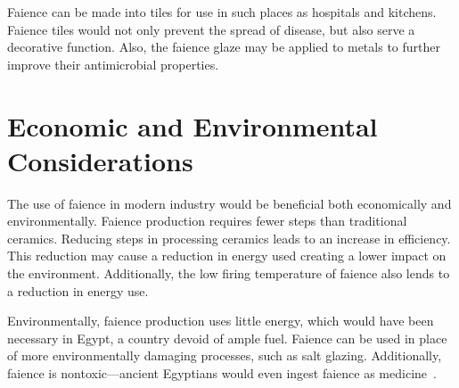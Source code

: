 Faience can be made into tiles for use in such places as hospitals and kitchens. Faience tiles would not only prevent the spread of disease, but also serve a decorative function. Also, the faience glaze may be applied to metals to further improve their antimicrobial properties.


\section{Economic and Environmental Considerations}


The use of faience in modern industry would be beneficial both economically and environmentally. Faience production requires fewer steps than traditional ceramics. Reducing steps in processing ceramics leads to an increase in efficiency. This reduction may cause a reduction in energy used creating a lower impact on the environment. Additionally, the low firing temperature of faience also lends to a reduction in energy use.

Environmentally, faience production uses little energy, which would have been necessary in Egypt, a country devoid of ample fuel. Faience can be used in place of more environmentally damaging processes, such as salt glazing. Additionally, faience is nontoxic---ancient Egyptians would even ingest faience as medicine~\cite{bittle11}.
 

